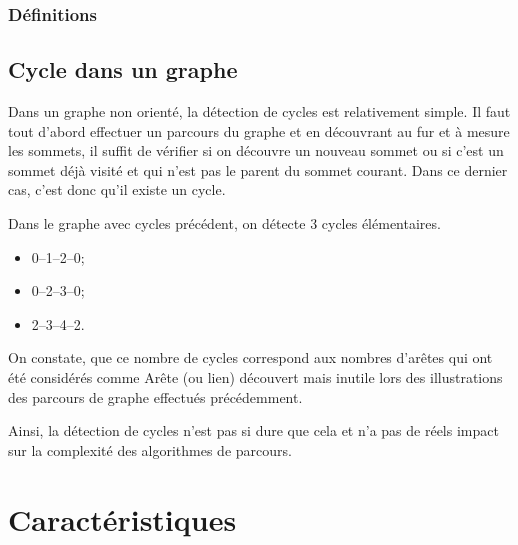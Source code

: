 \begin{frame}
\frametitle{Définitions}

\subsection{Cycle dans un graphe}
Dans un graphe non orienté, la détection de cycles est relativement simple. Il faut tout d'abord effectuer un parcours du graphe et en découvrant au fur et à mesure les sommets, il suffit de vérifier si on découvre un nouveau sommet ou si c'est un sommet déjà visité et qui n'est pas le parent du sommet courant. Dans ce dernier cas, c'est donc qu'il existe un cycle.

Dans le graphe avec cycles précédent, on détecte 3 cycles élémentaires. \begin{itemize}
\item 0--1--2--0;
\item 0--2--3--0;
\item 2--3--4--2.
\end{itemize}

On constate, que ce nombre de cycles correspond aux nombres d'arêtes qui ont été considérés comme \og Arête (ou lien) découvert mais inutile  \fg{} lors des illustrations des parcours de graphe effectués précédemment.

Ainsi, la détection de cycles n'est pas si \og dure \fg{} que cela et n'a pas de réels impact sur la complexité des algorithmes de parcours. 
\end{frame}

\section{Caractéristiques}

